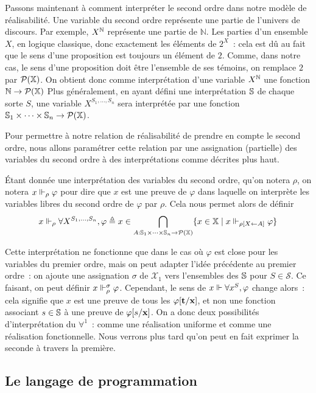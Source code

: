 \documentclass{article}
\begin{document}
Passons maintenant à comment interpréter le second ordre dans notre modèle de réalisabilité. Une variable du second ordre représente une partie de l'univers de discours. Par exemple, $X^{\mathbb{N}}$ représente une partie de $\mathbb N$. Les parties d'un ensemble $X$, en logique classique, donc exactement les éléments de $2^X$~: cela est dû au fait que le sens d'une proposition est toujours un élément de $2$. Comme, dans notre cas, le sens d'une proposition doit être l'ensemble de ses témoins, on remplace $2$ par $\mathcal P(\mathbb X)$. On obtient donc comme interprétation d'une variable $X^{\mathbb{N}}$ une fonction $\mathbb N \to \mathcal P (\mathbb X)$ Plus généralement, en ayant défini une interprétation $\mathbb{S}$ de chaque sorte $S$, une variable $X^{S_1,\ldots,S_n}$ sera interprétée par une fonction $\mathbb{S}_1\times\cdots\times\mathbb{S}_n \to \mathcal P(\mathbb X)$.

Pour permettre à notre relation de réalisabilité de prendre en compte le second ordre, nous allons paramétrer cette relation par une assignation (partielle) des variables du second ordre à des interprétations comme décrites plus haut.

\'Etant donnée une interprétation des variables du second ordre, qu'on notera $\rho$, on notera $x\Vdash_\rho \varphi$ pour dire que $x$ est une preuve de $\varphi$ dans laquelle on interprète les variables libres du second ordre de $\varphi$ par $\rho$. Cela nous permet alors de définir \[x\Vdash_\rho \forall X^{S_1,\ldots,S_n}, \varphi \triangleq x\in \bigcap_{A : \mathbb{S}_1\times\cdots\times \mathbb{S}_n \to \mathcal P(\mathbb X)} \{x \in \mathbb X\mid x\Vdash_{\rho[X\leftarrow A]} \varphi\}\]

Cette interprétation ne fonctionne que dans le cas où $\varphi$ est close pour les variables du premier ordre, mais on peut adapter l'idée précédente au premier ordre~: on ajoute une assignation $\sigma$ de $\mathcal X_1$ vers l'ensembles des $\mathbb{S}$ pour $S\in\mathcal S$. Ce faisant, on peut définir $x\Vdash_\rho^\sigma \varphi$. Cependant, le sens de $x\Vdash \forall x^S, \varphi$ change alors~: cela signifie que $x$ est une preuve de tous les $\varphi[\mathbf{t}/\mathbf{x}]$, et non une fonction associant $s\in \mathbb{S}$ à une preuve de $\varphi[s/\mathbf{x}]$. On a donc deux possibilités d'interprétation du $\forall^1$~: comme une réalisation uniforme et comme une réalisation fonctionnelle. Nous verrons plus tard qu'on peut en fait exprimer la seconde à travers la première.

\subsection{Le langage de programmation}
\end{document}
